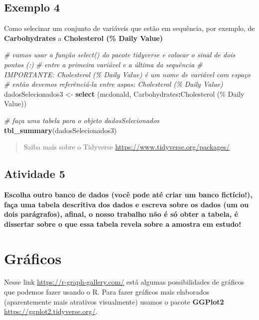 \documentclass[
]{book}
\newenvironment{Shaded}{\begin{snugshade}}{\end{snugshade}}
\newcommand{\AttributeTok}[1]{\textcolor[rgb]{0.13,0.29,0.53}{#1}}
\newcommand{\CommentTok}[1]{\textcolor[rgb]{0.56,0.35,0.01}{\textit{#1}}}
\newcommand{\FunctionTok}[1]{\textcolor[rgb]{0.13,0.29,0.53}{\textbf{#1}}}
\newcommand{\NormalTok}[1]{#1}
\newcommand{\OtherTok}[1]{\textcolor[rgb]{0.56,0.35,0.01}{#1}}
\newcommand{\SpecialCharTok}[1]{\textcolor[rgb]{0.81,0.36,0.00}{\textbf{#1}}}
\newcommand{\StringTok}[1]{\textcolor[rgb]{0.31,0.60,0.02}{#1}}
\begin{document}
\section{Exemplo 4}\label{exemplo-4}

Como selecinar um conjunto de variáveis que estão em sequência, por exemplo, de \textbf{Carbohydrates} a \textbf{Cholesterol (\% Daily Value)}

\begin{Shaded}
\begin{Highlighting}[]
\CommentTok{\# vamos usar a função select() do pacote tidyverse e colocar o sinal de dois pontos (:)}
\CommentTok{\# entre a primeira variável e a última da sequência }
\CommentTok{\# IMPORTANTE: Cholesterol (\% Daily Value) é um nome de variável com espaço }
\CommentTok{\# então devemos referênciá{-}la entre aspas: \textasciigrave{}Cholesterol (\% Daily Value)\textasciigrave{}}
\NormalTok{dadosSelecionados3 }\OtherTok{\textless{}{-}} \FunctionTok{select}\NormalTok{ (mcdonald, Carbohydrates}\SpecialCharTok{:}\StringTok{\textasciigrave{}}\AttributeTok{Cholesterol (\% Daily Value)}\StringTok{\textasciigrave{}}\NormalTok{)}

\CommentTok{\# faça uma tabela para o objeto dadosSelecionados}
\FunctionTok{tbl\_summary}\NormalTok{(dadosSelecionados3)}
\end{Highlighting}
\end{Shaded}

\begin{quote}
Saiba mais sobre o Tidyverse \url{https://www.tidyverse.org/packages/}
\end{quote}

\section{Atividade 5}\label{atividade-5}

\textbf{Escolha outro banco de dados (você pode até criar um banco fictício!), faça uma tabela descritiva dos dados e escreva sobre os dados (um ou dois parágrafos), afinal, o nosso trabalho não é só obter a tabela, é dissertar sobre o que essa tabela revela sobre a amostra em estudo!}

\chapter{Gráficos}\label{gruxe1ficos}

Nesse link \url{https://r-graph-gallery.com/} está algumas possibilidades de gráficos que podemos fazer usando o R. Para fazer gráficos mais elaborados (aparentemente mais atrativos visualmente) usamos o pacote \textbf{GGPlot2} \url{https://ggplot2.tidyverse.org/}.
\end{document}
